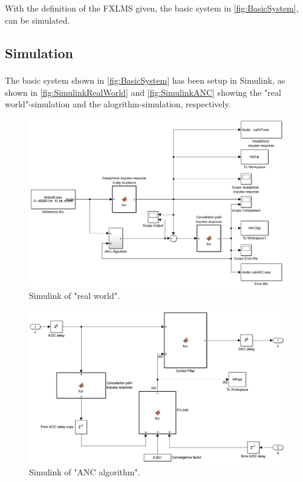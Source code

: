 With the definition of the FXLMS given, the basic system in \autoref{fig:BasicSystem}, can be simulated.



\subsection{Simulation} 
The basic system shown in \autoref{fig:BasicSystem} has been setup in Simulink\textsuperscript{\textregistered}, as shown in \autoref{fig:SimulinkRealWorld} and \autoref{fig:SimulinkANC} showing the "real world"-simulation and the alogrithm-simulation, respectively.

\begin{figure}[H]
	\centering
	\includegraphics[width=1\textwidth]{figures/BasicSystem/SimulinkRealWorld}
	\caption{Simulink of "real world".}
	\label{fig:SimulinkRealWorld}
\end{figure}    

\begin{figure}[H]
	\centering
	\includegraphics[width=1\textwidth]{figures/BasicSystem/SimulinkANC}
	\caption{Simulink of "ANC algorithm".}
	\label{fig:SimulinkANC}
\end{figure} 

